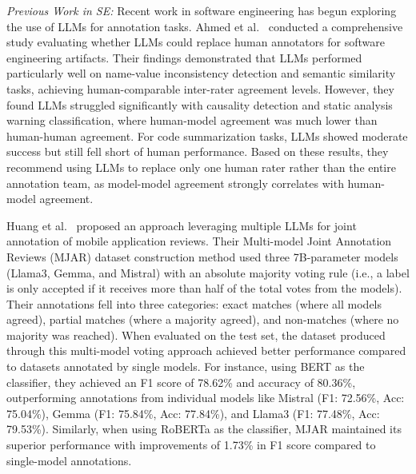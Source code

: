 \documentclass[11pt]{article}
\begin{document}
\emph{Previous Work in SE:} Recent work in software engineering has begun exploring the use of LLMs for annotation tasks. 
Ahmed et al.~\cite{DBLP:journals/corr/abs-2408-05534} conducted a comprehensive study evaluating whether LLMs could replace human annotators for software engineering artifacts.
Their findings demonstrated that LLMs performed particularly well on name-value inconsistency detection and semantic similarity tasks, achieving human-comparable inter-rater agreement levels. 
However, they found LLMs struggled significantly with causality detection and static analysis warning classification, where human-model agreement was much lower than human-human agreement. 
For code summarization tasks, LLMs showed moderate success but still fell short of human performance. 
Based on these results, they recommend using LLMs to replace only one human rater rather than the entire annotation team, as model-model agreement strongly correlates with human-model agreement.

Huang et al.~\cite{Huang2023Enhancing} proposed an approach leveraging multiple LLMs for joint annotation of mobile application reviews. 
Their Multi-model Joint Annotation Reviews (MJAR) dataset construction method used three 7B-parameter models (Llama3, Gemma, and Mistral) with an absolute majority voting rule (i.e., a label is only accepted if it receives more than half of the total votes from the models). 
Their annotations fell into three categories: exact matches (where all models agreed), partial matches (where a majority agreed), and non-matches (where no majority was reached). 
When evaluated on the test set, the dataset produced through this multi-model voting approach achieved better performance compared to datasets annotated by single models. 
For instance, using BERT as the classifier, they achieved an F1 score of 78.62\% and accuracy of 80.36\%, outperforming annotations from individual models like Mistral (F1: 72.56\%, Acc: 75.04\%), Gemma (F1: 75.84\%, Acc: 77.84\%), and Llama3 (F1: 77.48\%, Acc: 79.53\%). 
Similarly, when using RoBERTa as the classifier, MJAR maintained its superior performance with improvements of 1.73\% in F1 score compared to single-model annotations.
\end{document}
